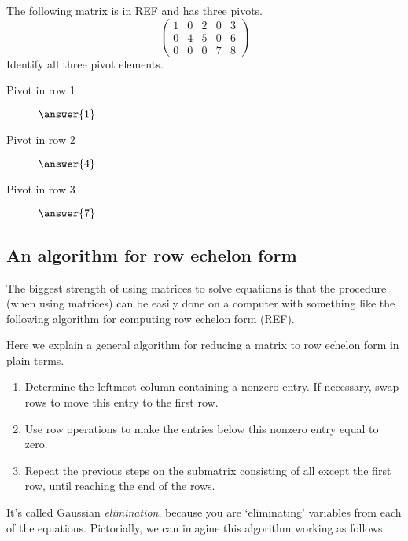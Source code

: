 \documentclass{ximera}
\begin{document}
\begin{question}
  The following matrix is in REF and has three pivots.
  \[
    \begin{pmatrix}
      1 & 0 & 2 & 0 & 3 \\
      0 & 4 & 5 & 0 & 6 \\
      0 & 0 & 0 & 7 & 8
    \end{pmatrix}
  \]
  Identify all three pivot elements.
  \begin{prompt}
  \begin{description}
  \item[Pivot in row 1] $\answer{1}$
  \item[Pivot in row 2] $\answer{4}$
  \item[Pivot in row 3] $\answer{7}$
  \end{description}
\end{prompt}
\end{question}


\subsection{An algorithm for row echelon form}

The biggest strength of using matrices to solve equations is that the
procedure (when using matrices) can be easily done on a computer with
something like the following algorithm for computing row echelon form
(REF).

\begin{algorithm}
  Here we explain a general algorithm for reducing a matrix to row
  echelon form in plain terms.
  \begin{enumerate}
  \item Determine the leftmost column containing a nonzero entry. If
    necessary, swap rows to move this entry to the first row.
  \item Use row operations to make the entries below this nonzero
    entry equal to zero.
  \item Repeat the previous steps on the submatrix consisting of all
    except the first row, until reaching the end of the rows.
  \end{enumerate}
\end{algorithm}

It's called Gaussian \textit{elimination}, because you are
`eliminating' variables from each of the equations.  Pictorially, we
can imagine this algorithm working as follows:
\end{document}
